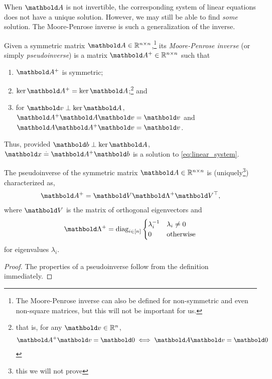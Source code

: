 When $\mA$ is not invertible, the corresponding system of linear equations does not have a unique solution. However, we may still be able to find \emph{some} solution. The Moore-Penrose inverse is such a generalization of the inverse.

\begin{defn} Given a symmetric matrix $\mA \in \R^{n \times n}$,\footnote{The Moore-Penrose inverse can also be defined for non-symmetric and even non-square matrices, but this will not be important for us.} its \emph{Moore-Penrose inverse} (or simply \emph{pseudoinverse}) is a matrix $\pinv{\mA} \in \R^{n \times n}$ such that \begin{enumerate}
    \item $\pinv{\mA}$ is symmetric;
    \item $\ker{\pinv{\mA}} = \ker{\mA}$;\footnote{that is, for any $\vv \in \R^n$, \begin{align*}
        \pinv{\mA}\vv = \vZero \iff \mA\vv = \vZero
    \end{align*}} and
    \item for $\vv \perp \ker{\mA}$, $\pinv{\mA}\mA\vv = \vv$ and $\mA\pinv{\mA}\vv = \vv$.
\end{enumerate}
\end{defn}

Thus, provided $\vb \perp \ker\mA$, $\vx \defeq \pinv{\mA}\vb$ is a solution to \cref{eq:linear_system}.

\begin{lem}
The pseudoinverse of the symmetric matrix $\mA \in \R^{n \times n}$ is (uniquely\footnote{this we will not prove}) characterized as, \begin{align}
    \pinv{\mA} = \mV\pinv{\mLambda}\trans{\mV},
\end{align} where $\mV$ is the matrix of orthogonal eigenvectors and \begin{align}
    \pinv{\mLambda} = \diag_{i\in[n]}\begin{cases}
    \inv{\lambda_i} & \lambda_i \neq 0 \\
    0 & \text{otherwise}
    \end{cases}
\end{align} for eigenvalues $\lambda_i$.
\end{lem}
\begin{proof}
The properties of a pseudoinverse follow from the definition immediately.
\end{proof}

